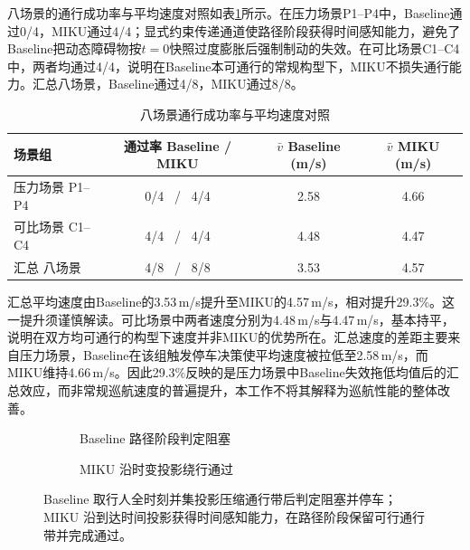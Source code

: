\documentclass[a4paper,11pt]{ctexart}
\providecommand{\datapath}{../../图片/data/01_crossing_ped/}
\theoremstyle{definition}
\begin{document}
八场景的通行成功率与平均速度对照如表\ref{tab:exp_pass}所示。在压力场景P1--P4中，Baseline通过0/4，MIKU通过4/4；显式约束传递通道使路径阶段获得时间感知能力，避免了Baseline把动态障碍物按$t=0$快照过度膨胀后强制制动的失效。在可比场景C1--C4中，两者均通过4/4，说明在Baseline本可通行的常规构型下，MIKU不损失通行能力。汇总八场景，Baseline通过4/8，MIKU通过8/8。

\begin{table}[htbp]
\centering
\caption{八场景通行成功率与平均速度对照}
\label{tab:exp_pass}
\small
\begin{tabular}{lccc}
\toprule
\textbf{场景组} & \textbf{通过率 Baseline / MIKU} & \textbf{$\bar v$ Baseline (m/s)} & \textbf{$\bar v$ MIKU (m/s)} \\
\midrule
压力场景 P1--P4 & 0/4 \ / \ 4/4 & 2.58 & 4.66 \\
可比场景 C1--C4 & 4/4 \ / \ 4/4 & 4.48 & 4.47 \\
\midrule
汇总 八场景 & 4/8 \ / \ 8/8 & 3.53 & 4.57 \\
\bottomrule
\end{tabular}
\end{table}

汇总平均速度由Baseline的3.53\,m/s提升至MIKU的4.57\,m/s，相对提升29.3\%。这一提升须谨慎解读。可比场景中两者速度分别为4.48\,m/s与4.47\,m/s，基本持平，说明在双方均可通行的构型下速度并非MIKU的优势所在。汇总速度的差距主要来自压力场景，Baseline在该组触发停车决策使平均速度被拉低至2.58\,m/s，而MIKU维持4.66\,m/s。因此29.3\%反映的是压力场景中Baseline失效拖低均值后的汇总效应，而非常规巡航速度的普遍提升，本工作不将其解释为巡航性能的整体改善。

\begin{figure}[htbp]
\centering
\begingroup
\renewcommand{\datapath}{../../图片/data/01_crossing_ped/}
\begin{subfigure}[b]{0.46\textwidth}
  \centering
  \caption{Baseline 路径阶段判定阻塞}
\end{subfigure}\hfill
\begin{subfigure}[b]{0.46\textwidth}
  \centering
  \caption{MIKU 沿时变投影绕行通过}
\end{subfigure}
\endgroup
\caption{压力场景 P1 单行人横穿的 SL 路径边界对照}
\caption*{Baseline 取行人全时刻并集投影压缩通行带后判定阻塞并停车；MIKU 沿到达时间投影获得时间感知能力，在路径阶段保留可行通行带并完成通过。}
\label{fig:exp_p1_sl}
\end{figure}
\end{document}
